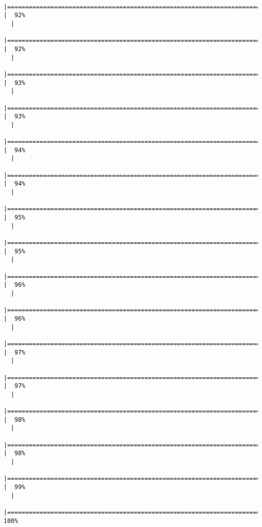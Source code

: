 \documentclass[12pt]{article}
\begin{document}
\begin{verbatim}
  |==================================================================================        |  92%
  |                                                                                                
  |===================================================================================       |  92%
  |                                                                                                
  |===================================================================================       |  93%
  |                                                                                                
  |====================================================================================      |  93%
  |                                                                                                
  |====================================================================================      |  94%
  |                                                                                                
  |=====================================================================================     |  94%
  |                                                                                                
  |=====================================================================================     |  95%
  |                                                                                                
  |======================================================================================    |  95%
  |                                                                                                
  |======================================================================================    |  96%
  |                                                                                                
  |=======================================================================================   |  96%
  |                                                                                                
  |=======================================================================================   |  97%
  |                                                                                                
  |========================================================================================  |  97%
  |                                                                                                
  |========================================================================================  |  98%
  |                                                                                                
  |========================================================================================= |  98%
  |                                                                                                
  |========================================================================================= |  99%
  |                                                                                                
  |==========================================================================================| 100%
\end{verbatim}
\end{document}

